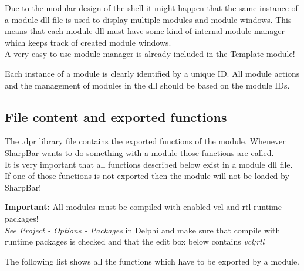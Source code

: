 \documentclass[a4paper]{article}
\begin{document}
  Due to the modular design of the shell it might happen that the same instance of a module dll file is used to display multiple modules and module windows. This means that each module dll must have some kind of internal module manager which keeps track of created module windows. \\
  A very easy to use module manager is already included in the Template module! 

  Each instance of a module is clearly identified by a unique ID. All module actions and the management of modules in the dll should be based on the module IDs.

\subsection{File content and exported functions}
  The .dpr library file contains the exported functions of the module. Whenever SharpBar wants to do something with a module those functions are called. \\
  It is very important that all functions described below exist in a module dll file. If one of those functions is not exported then the module will not be loaded by SharpBar! 

  {\bf Important:} All modules must be compiled with enabled vcl and rtl runtime packages! \\
  {\it See Project - Options - Packages} in Delphi and make sure that compile with runtime packages is checked and that the edit box below contains {\it vcl;rtl}

  \newpage
  The following list shows all the functions which have to be exported by a module.
  
\end{document}

